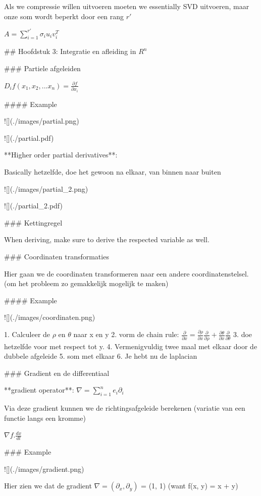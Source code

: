 \documentclass[a4paper]{article}
\begin{document}
Als we compressie willen uitvoeren moeten we essentially SVD uitvoeren, maar onze som wordt beperkt door een rang $r'$

$A = \sum_{i=1}^{r'} \sigma_i u_i v_i^T$

## Hoofdstuk 3: Integratie en afleiding in $R^n$

### Partiele afgeleiden

$D_i f(x_1, x_2, ... x_n) = \frac{\partial f}{\partial x_i}$

#### Example

![](./images/partial.png)

![](./partial.pdf)


**Higher order partial derivatives**:

Basically hetzelfde, doe het gewoon na elkaar, van binnen naar buiten

![](./images/partial_2.png)

![](./partial_2.pdf)


### Kettingregel

When deriving, make sure to derive the respected variable as well.

### Coordinaten transformaties

Hier gaan we de coordinaten transformeren naar een andere coordinatenstelsel. (om het probleem zo gemakkelijk mogelijk te maken)

#### Example

![](./images/coordinaten.png)

1. Calculeer de $\rho$ en $\theta$ naar x en y
2. vorm de chain rule: $\frac{\partial}{\partial x} = \frac{\partial \rho}{\partial x} \frac{\partial}{\partial \rho} + \frac{\partial \theta}{\partial x} \frac{\partial}{\partial \theta}$
3. doe hetzelfde voor met respect tot y.
4. Vermenigvuldig twee maal met elkaar door de dubbele afgeleide
5. som met elkaar
6. Je hebt nu de laplacian

### Gradient en de differentiaal

**gradient operator**: $\nabla = \sum_{i=1}^{n} e_i \partial_i$

Via deze gradient kunnen we de richtingsafgeleide berekenen (variatie van een functie langs een kromme)

$\nabla f . \frac{dx}{dt}$

### Example

![](./images/gradient.png)

Hier zien we dat de gradient $\nabla = (\partial_x, \partial_y)$ = (1, 1) (want f(x, y) = x + y)
\end{document}

